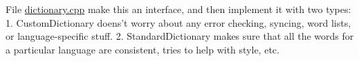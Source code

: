 \label{todo__todo000001}
\hypertarget{todo__todo000001}{}
 
\begin{DoxyDescription}
\item[File \hyperlink{dictionary_8cpp}{dictionary.cpp} ]make this an interface, and then implement it with two types: 1. CustomDictionary doens't worry about any error checking, syncing, word lists, or language-\/specific stuff. 2. StandardDictionary makes sure that all the words for a particular language are consistent, tries to help with style, etc. 
\end{DoxyDescription}